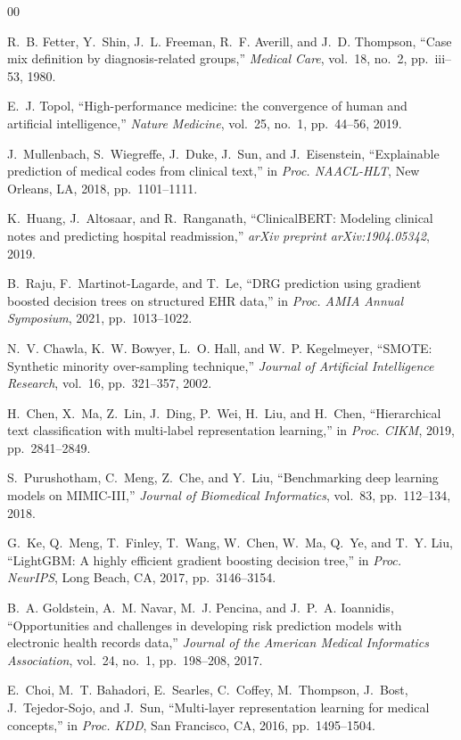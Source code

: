 \documentclass{IEEEtran}
\begin{document}
\begin{thebibliography}{00}

R.~B. Fetter, Y.~Shin, J.~L. Freeman, R.~F. Averill, and J.~D. Thompson,
``Case mix definition by diagnosis-related groups,''
\textit{Medical Care}, vol.~18, no.~2, pp.~iii--53, 1980.

E.~J. Topol,
``High-performance medicine: the convergence of human and artificial
intelligence,''
\textit{Nature Medicine}, vol.~25, no.~1, pp.~44--56, 2019.

J.~Mullenbach, S.~Wiegreffe, J.~Duke, J.~Sun, and J.~Eisenstein,
``Explainable prediction of medical codes from clinical text,''
in \textit{Proc. NAACL-HLT}, New Orleans, LA, 2018, pp.~1101--1111.

K.~Huang, J.~Altosaar, and R.~Ranganath,
``ClinicalBERT: Modeling clinical notes and predicting hospital
readmission,''
\textit{arXiv preprint arXiv:1904.05342}, 2019.

B.~Raju, F.~Martinot-Lagarde, and T.~Le,
``DRG prediction using gradient boosted decision trees on
structured EHR data,''
in \textit{Proc. AMIA Annual Symposium}, 2021, pp.~1013--1022.

N.~V. Chawla, K.~W. Bowyer, L.~O. Hall, and W.~P. Kegelmeyer,
``SMOTE: Synthetic minority over-sampling technique,''
\textit{Journal of Artificial Intelligence Research},
vol.~16, pp.~321--357, 2002.

H.~Chen, X.~Ma, Z.~Lin, J.~Ding, P.~Wei, H.~Liu, and H.~Chen,
``Hierarchical text classification with multi-label representation
learning,''
in \textit{Proc. CIKM}, 2019, pp.~2841--2849.

S.~Purushotham, C.~Meng, Z.~Che, and Y.~Liu,
``Benchmarking deep learning models on MIMIC-III,''
\textit{Journal of Biomedical Informatics}, vol.~83, pp.~112--134, 2018.

G.~Ke, Q.~Meng, T.~Finley, T.~Wang, W.~Chen, W.~Ma, Q.~Ye, and T.~Y. Liu,
``LightGBM: A highly efficient gradient boosting decision tree,''
in \textit{Proc. NeurIPS}, Long Beach, CA, 2017, pp.~3146--3154.

B.~A. Goldstein, A.~M. Navar, M.~J. Pencina, and J.~P.~A. Ioannidis,
``Opportunities and challenges in developing risk prediction models with
electronic health records data,''
\textit{Journal of the American Medical Informatics Association},
vol.~24, no.~1, pp.~198--208, 2017.

E.~Choi, M.~T. Bahadori, E.~Searles, C.~Coffey, M.~Thompson,
J.~Bost, J.~Tejedor-Sojo, and J.~Sun,
``Multi-layer representation learning for medical concepts,''
in \textit{Proc. KDD}, San Francisco, CA, 2016, pp.~1495--1504.

\end{thebibliography}
\end{document}
